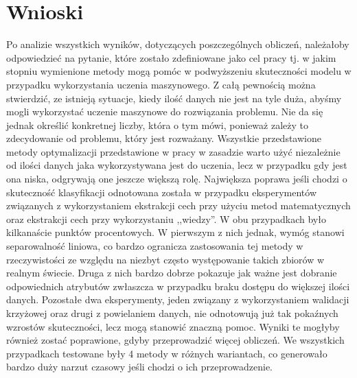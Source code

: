 
\section{Wnioski}\label{conclusion}
Po analizie wszystkich wyników, dotyczących poszczególnych obliczeń, należałoby odpowiedzieć na pytanie, które zostało zdefiniowane jako cel pracy tj. w jakim stopniu wymienione metody mogą pomóc w podwyższeniu skuteczności modelu w przypadku wykorzystania uczenia maszynowego. Z całą pewnością można stwierdzić, ze istnieją  sytuacje, kiedy ilość danych nie jest na tyle duża, abyśmy mogli wykorzystać uczenie maszynowe do rozwiązania problemu. Nie da się jednak określić konkretnej liczby, która o tym mówi, ponieważ zależy to zdecydowanie od problemu, który jest rozważany. Wszystkie przedstawione metody optymalizacji przedstawione w pracy w zasadzie warto użyć niezależnie od ilości danych jaka wykorzystywana jest do uczenia, lecz w przypadku gdy jest ona niska, odgrywają one jeszcze większą rolę. Największa poprawa jeśli chodzi o skuteczność klasyfikacji odnotowana została w przypadku eksperymentów związanych z wykorzystaniem ekstrakcji cech przy użyciu metod matematycznych oraz ekstrakcji cech przy wykorzystaniu ,,wiedzy''. W obu przypadkach było kilkanaście punktów procentowych. W pierwszym z nich jednak, wymóg stanowi separowalność liniowa, co bardzo ogranicza zastosowania tej metody w rzeczywistości ze względu na niezbyt często występowanie takich zbiorów w realnym świecie. Druga z nich bardzo dobrze pokazuje jak ważne jest dobranie odpowiednich atrybutów zwłaszcza w przypadku braku dostępu do większej ilości danych. Pozostałe dwa eksperymenty, jeden związany z wykorzystaniem walidacji krzyżowej oraz drugi z powielaniem danych, nie odnotowują już tak pokaźnych wzrostów skuteczności, lecz mogą stanowić znaczną pomoc. Wyniki te mogłyby również zostać poprawione, gdyby przeprowadzić więcej obliczeń. We wszystkich przypadkach testowane były 4 metody w różnych wariantach, co generowało bardzo duży narzut czasowy jeśli chodzi o ich przeprowadzenie.

